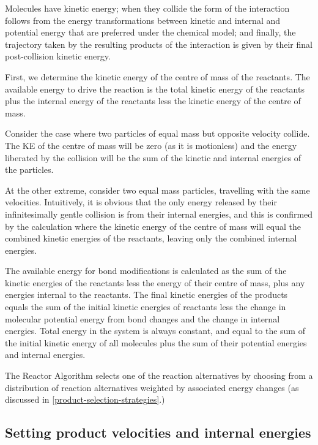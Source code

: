Molecules have kinetic energy; when they collide the form of the
interaction follows from the energy transformations between kinetic and
internal and potential energy that are preferred under the chemical
model; and finally, the trajectory taken by the resulting products of
the interaction is given by their final post-collision kinetic energy.

First, we determine the kinetic energy of the centre of mass of the
reactants. The available energy to drive the reaction is the total
kinetic energy of the reactants plus the internal energy of the
reactants less the kinetic energy of the centre of mass.

Consider the case where two particles of equal mass but opposite
velocity collide. The KE of the centre of mass will be zero (as it is
motionless) and the energy liberated by the collision will be the sum of
the kinetic and internal energies of the particles.

At the other extreme, consider two equal mass particles, travelling with
the same velocities. Intuitively, it is obvious that the only energy
released by their infinitesimally gentle collision is from their
internal energies, and this is confirmed by the calculation where the
kinetic energy of the centre of mass will equal the combined kinetic
energies of the reactants, leaving only the combined internal energies.

The available energy for bond modifications is calculated as the sum of
the kinetic energies of the reactants less the energy of their centre of
mass, plus any energies internal to the reactants. The final kinetic
energies of the products equals the sum of the initial kinetic energies
of reactants less the change in molecular potential energy from bond
changes and the change in internal energies. Total energy in the system
is always constant, and equal to the sum of the initial kinetic energy
of all molecules plus the sum of their potential energies and internal
energies.

The Reactor Algorithm selects one of the reaction alternatives by
choosing from a distribution of reaction alternatives weighted by
associated energy changes (as discussed in
\cref{product-selection-strategies}.)

\subsection{Setting product velocities and internal energies}\label{setting-product-velocities-and-internal-energies}

